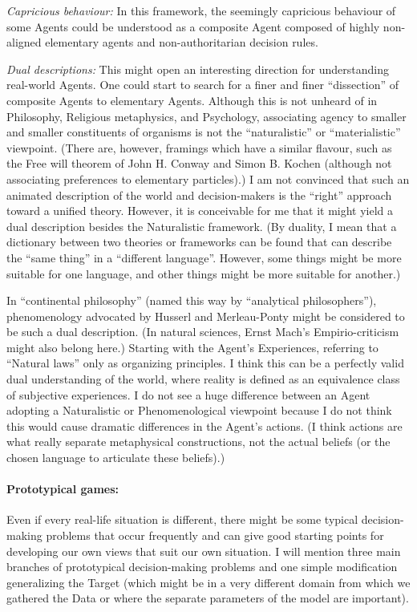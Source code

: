 \documentclass{article}
\begin{document}
{\it Capricious behaviour:}
In this framework, the seemingly capricious behaviour of some Agents could be understood as a composite Agent composed of highly non-aligned elementary agents and non-authoritarian decision rules.

{\it Dual descriptions:}
This might open an interesting direction for understanding real-world Agents. One could start to search for a finer and finer ``dissection'' of composite Agents to elementary Agents. Although this is not unheard of in Philosophy, Religious metaphysics, and Psychology, associating agency to smaller and smaller constituents of organisms is not the ``naturalistic'' or ``materialistic'' viewpoint.
(There are, however, framings which have a similar flavour, such as the Free will theorem of John H. Conway and Simon B. Kochen (although not associating preferences to elementary particles).)
I am not convinced that such an animated description of the world and decision-makers is the ``right'' approach toward a unified theory. However, it is conceivable for me that it might yield a dual description besides the Naturalistic framework. (By duality, I mean that a dictionary between two theories or frameworks can be found that can describe the ``same thing'' in a ``different language''. However, some things might be more suitable for one language, and other things might be more suitable for another.)

In ``continental philosophy'' (named this way by ``analytical philosophers''), phenomenology advocated by Husserl and Merleau-Ponty might be considered to be such a dual description. (In natural sciences, Ernst Mach’s Empirio-criticism might also belong here.) Starting with the Agent's Experiences, referring to ``Natural laws'' only as organizing principles. I think this can be a perfectly valid dual understanding of the world, where reality is defined as an equivalence class of subjective experiences.
I do not see a huge difference between an Agent adopting a Naturalistic or Phenomenological viewpoint because I do not think this would cause dramatic differences in the Agent’s actions.
(I think actions are what really separate metaphysical constructions, not the actual beliefs (or the chosen language to articulate these beliefs).)

\paragraph{Prototypical games:}
Even if every real-life situation is different, there might be some typical decision-making problems that occur frequently and can give good starting points for developing our own views that suit our own situation.
I will mention three main branches of prototypical decision-making problems and one simple modification generalizing the Target (which might be in a very different domain from which we gathered the Data or where the separate parameters of the model are important).
\end{document}
